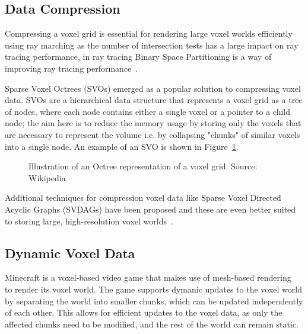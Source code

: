 \documentclass{article}
\begin{document}
\subsection{Data Compression}
Compressing a voxel grid is essential for rendering large voxel worlds efficiently using ray marching as the number of intersection tests has a large impact on ray tracing performance, in ray tracing Binary Space Partitioning is a way of improving ray tracing performance~\cite{Ize_2009}.

Sparse Voxel Octrees (SVOs) emerged as a popular solution to compressing voxel data. SVOs are a hierarchical data structure that represents a voxel grid as a tree of nodes, where each node contains either a single voxel or a pointer to a child node; the aim here is to reduce the memory usage by storing only the voxels that are necessary to represent the volume i.e. by collapsing "chunks" of similar voxels into a single node. An example of an SVO is shown in Figure~\ref{fig:svo}.

\begin{figure}[thp]
    \begin{center}
    \end{center}
    \caption{Illustration of an Octree representation of a voxel grid. Source: Wikipedia}
    \label{fig:svo}
\end{figure}

Additional techniques for compression voxel data like Sparse Voxel Directed Acyclic Graphs (SVDAGs) have been proposed and these are even better suited to storing large, high-resolution voxel worlds~\cite{Kampe_Sintorn_Assarsson}.

\subsection{Dynamic Voxel Data}
Minecraft is a voxel-based video game that makes use of mesh-based rendering~\label{Mesh-based Rendering} to render its voxel world. The game supports dymanic updates to the voxel world by separating the world into smaller chunks, which can be updated independently of each other. This allows for efficient updates to the voxel data, as only the affected chunks need to be modified, and the rest of the world can remain static.
\end{document}
